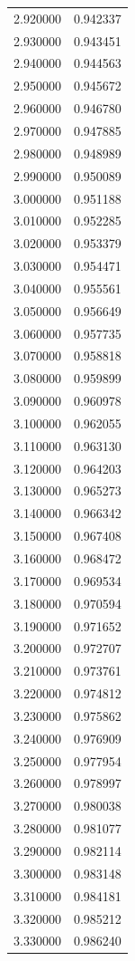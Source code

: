 \begin{tabular}{rr}
2.920000 & 0.942337 \\
2.930000 & 0.943451 \\
2.940000 & 0.944563 \\
2.950000 & 0.945672 \\
2.960000 & 0.946780 \\
2.970000 & 0.947885 \\
2.980000 & 0.948989 \\
2.990000 & 0.950089 \\
3.000000 & 0.951188 \\
3.010000 & 0.952285 \\
3.020000 & 0.953379 \\
3.030000 & 0.954471 \\
3.040000 & 0.955561 \\
3.050000 & 0.956649 \\
3.060000 & 0.957735 \\
3.070000 & 0.958818 \\
3.080000 & 0.959899 \\
3.090000 & 0.960978 \\
3.100000 & 0.962055 \\
3.110000 & 0.963130 \\
3.120000 & 0.964203 \\
3.130000 & 0.965273 \\
3.140000 & 0.966342 \\
3.150000 & 0.967408 \\
3.160000 & 0.968472 \\
3.170000 & 0.969534 \\
3.180000 & 0.970594 \\
3.190000 & 0.971652 \\
3.200000 & 0.972707 \\
3.210000 & 0.973761 \\
3.220000 & 0.974812 \\
3.230000 & 0.975862 \\
3.240000 & 0.976909 \\
3.250000 & 0.977954 \\
3.260000 & 0.978997 \\
3.270000 & 0.980038 \\
3.280000 & 0.981077 \\
3.290000 & 0.982114 \\
3.300000 & 0.983148 \\
3.310000 & 0.984181 \\
3.320000 & 0.985212 \\
3.330000 & 0.986240 \\

\end{tabular}

